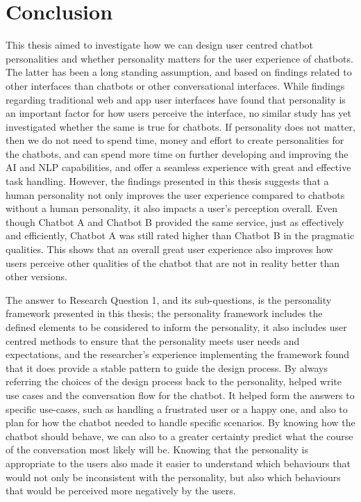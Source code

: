 \chapter{Conclusion}
\label{chap:conclusion}

This thesis aimed to investigate how we can design user centred chatbot personalities and whether personality matters for the user experience of chatbots. The latter has been a long standing assumption, and based on findings related to other interfaces than chatbots or other conversational interfaces. While findings regarding traditional web and app user interfaces have found that personality is an important factor for how users perceive the interface, no similar study has yet investigated whether the same is true for chatbots. If personality does not matter, then we do not need to spend time, money and effort to create personalities for the chatbots, and can spend more time on further developing and improving the AI and NLP capabilities, and offer a seamless experience with great and effective task handling. However, the findings presented in this thesis suggests that a human personality not only improves the user experience compared to chatbots without a human personality, it also impacts a user's perception overall. Even though Chatbot A and Chatbot B provided the same service, just as effectively and efficiently, Chatbot A was still rated higher than Chatbot B in the pragmatic qualities. This shows that an overall great user experience also improves how users perceive other qualities of the chatbot that are not in reality better than other versions.

The answer to Research Question 1, and its sub-questions, is the personality framework presented in this thesis; the personality framework includes the defined elements to be considered to inform the personality, it also includes user centred methods to ensure that the personality meets user needs and expectations, and the researcher's experience implementing the framework found that it does provide a stable pattern to guide the design process. By always referring the choices of the design process back to the personality, helped write use cases and the conversation flow for the chatbot. It helped form the answers to specific use-cases, such as handling a frustrated user or a happy one, and also to plan for how the chatbot needed to handle specific scenarios. By knowing how the chatbot should behave, we can also to a greater certainty predict what the course of the conversation most likely will be. Knowing that the personality is appropriate to the users also made it easier to understand which behaviours that would not only be inconsistent with the personality, but also which behaviours that would be perceived more negatively by the users.

